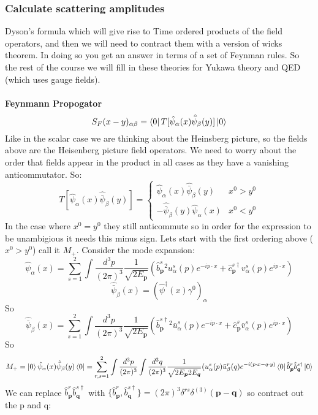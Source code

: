 \documentclass[12pt, a4paper, twoside, titlepage]{article}
\begin{document}
\begin{pmartix}
\subsubsection{Calculate scattering amplitudes}
Dyson's formula which will give rise to Time ordered products of the field operators, and then we will need to contract them with a version of wicks theorem. In doing so you get an answer in terms of a set of Feynman rules. So the rest of the course we will fill in these theories for Yukawa theory and QED (which uses gauge fields).\\\\
\textbf{Feynmann Propogator}\\
$$
S_F(x-y)_{\alpha \beta} = \bra{0} T[\hat \psi_{\alpha}(x) \hat {\bar{\psi}}_{\beta}(y)] \ket{0}
$$
Like in the scalar case we are thinking about the Heinsberg picture, so the fields above are the Heisenberg picture field operators. We need to worry about the order that fields appear in the product in all cases as they have a vanishing anticommutator. So:
$$
                                                T[\hat \psi_{\alpha}(x) \hat {\bar{\psi}}_{\beta}(y)]  = \begin{cases} \hat \psi_{\alpha}(x) \hat {\bar{\psi}}_{\beta}(y) & x^0 > y^0\\
                                                -\hat {\bar{\psi}}_{\beta}(y) \hat \psi_{\alpha}(x)  & x^0 < y^0 \end{cases}
$$
In the case where $x^0 = y^0$ they still anticommute so in order for the expression to be unambigious it needs this minus sign.  Lets start with the first ordering above ($x^0 > y^0$) call it $M_+$. Consider the mode expansion:
$$
\hat \psi_{\alpha}(x) = \sum_{s=1}^2 \int \frac{d^3 p}{(2 \pi)^3} \frac{1}{\sqrt{2 E_{\bm p}}} ( \hat b^s_{\bm p}^2 u^s_{\alpha}(p) e^{-i p\cdot x} + \hat c^{s \dagger}_{\bm p} v^s_{\alpha} (p) e^{i p \cdot x})
$$
$$
\hat {\bar{\psi}}_{\beta}(x) = (\hat \psi^{\dagger} (x) \gamma^0)_{\alpha}
$$
So
$$
\hat {\bar{\psi}}_{\beta}(x) = \sum_{s=1}^2 \int \frac{d^3 p}{(2 \pi)^3} \frac{1}{\sqrt{2 E_{\bm p}}} ( \hat b^{s \dagger}_{\bm p}^2 \bar{u}^s_{\alpha}(p) e^{-i p\cdot x} + \hat c^{s}_{\bm p} \bar{v}^s_{\alpha} (p) e^{i p \cdot x})
$$
So
$$
M_+ = \ket{0} \hat \psi_{\alpha}(x) \hat {\bar{\psi}}_{\beta}(y) \bra{0} = \sum_{r,s=1}^2 \int \frac{d^3p}{(2\pi)^3} \int \frac{d^3 q}{(2 \pi)^3} \frac{1}{\sqrt{2 E_{\bm p} 2 E_{\bm q}}} (u^s_{\alpha} (p) \bar{u}^r_{\beta} (q) e^{-i(p\cdot x - q \cdot y)} \bra{0} \hat b^r_{\bm p} \hat b^{s \dagger}_{\bm q} \ket{0}
$$
We can replace $ \hat b^r_{\bm p} \hat b^{s \dagger}_{\bm q}$ with $\{ \hat b^r_{\bm p} ,\hat b^{s \dagger}_{\bm q} \} = (2\pi)^3 \delta^{rs} \delta^{(3)}(\bm p - \bm q)$ so contract out the p and q:

\end{pmartix}
\end{document}
